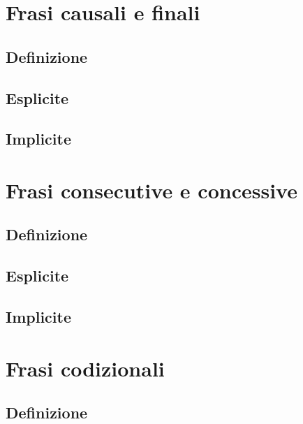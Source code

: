 \documentclass[a4paper,twoside,11pt,chapterprefix=false,bibliography=totocnumbered,listof=flat]{scrbook}
\begin{document}
\hypertarget{frasi-causali-e-finali}{%
\chapter{Frasi causali e finali}\label{frasi-causali-e-finali}}

\hypertarget{definizione-2}{%
\section{Definizione}\label{definizione-2}}

\hypertarget{esplicite-4}{%
\section{Esplicite}\label{esplicite-4}}

\hypertarget{implicite-4}{%
\section{Implicite}\label{implicite-4}}

\hypertarget{frasi-consecutive-e-concessive}{%
\chapter{Frasi consecutive e
concessive}\label{frasi-consecutive-e-concessive}}

\hypertarget{definizione-3}{%
\section{Definizione}\label{definizione-3}}

\hypertarget{esplicite-5}{%
\section{Esplicite}\label{esplicite-5}}

\hypertarget{implicite-5}{%
\section{Implicite}\label{implicite-5}}

\hypertarget{frasi-codizionali}{%
\chapter{Frasi codizionali}\label{frasi-codizionali}}

\hypertarget{definizione-4}{%
\section{Definizione}\label{definizione-4}}
\end{document}
